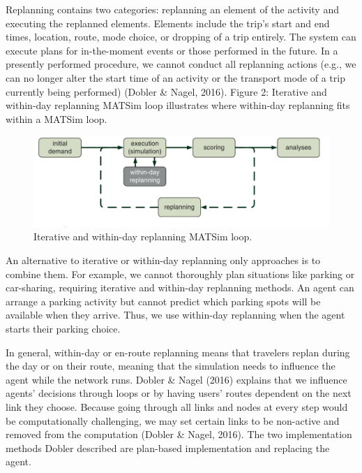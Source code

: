 \documentclass[fancy, oneside, mastersfancy, ms]{byuthesis}
\begin{document}
Replanning contains two categories: replanning an element of the
activity and executing the replanned elements. Elements include the
trip's start and end times, location, route, mode choice, or dropping of
a trip entirely. The system can execute plans for in-the-moment events
or those performed in the future. In a presently performed procedure, we
cannot conduct all replanning actions (e.g., we can no longer alter the
start time of an activity or the transport mode of a trip currently
being performed) (Dobler \& Nagel, 2016). Figure 2: Iterative and
within-day replanning MATSim loop illustrates where within-day
replanning fits within a MATSim loop.

\begin{figure}

{\centering \includegraphics{figures/matsim_loop.png}

}

\caption{Iterative and within-day replanning MATSim loop.}

\end{figure}

An alternative to iterative or within-day replanning only approaches is
to combine them. For example, we cannot thoroughly plan situations like
parking or car-sharing, requiring iterative and within-day replanning
methods. An agent can arrange a parking activity but cannot predict
which parking spots will be available when they arrive. Thus, we use
within-day replanning when the agent starts their parking choice.

In general, within-day or en-route replanning means that travelers
replan during the day or on their route, meaning that the simulation
needs to influence the agent while the network runs. Dobler \& Nagel
(2016) explains that we influence agents' decisions through loops or by
having users' routes dependent on the next link they choose. Because
going through all links and nodes at every step would be computationally
challenging, we may set certain links to be non-active and removed from
the computation (Dobler \& Nagel, 2016). The two implementation methods
Dobler described are plan-based implementation and replacing the agent.
\end{document}
